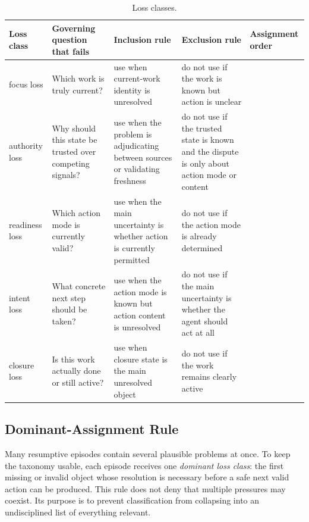 \documentclass[preprint,12pt]{elsarticle}
\begin{document}
\begin{table}[H]
\caption{Loss classes.}
\label{tab:loss-classes}
\centering
\footnotesize
\setlength{\tabcolsep}{4pt}
\begin{tabularx}{\textwidth}{>{\raggedright\arraybackslash}p{} >{\raggedright\arraybackslash}p{} >{\raggedright\arraybackslash}p{} >{\raggedright\arraybackslash}p{} >{\raggedright\arraybackslash}p{}}
\toprule
Loss class & Governing question that fails & Inclusion rule & Exclusion rule & Assignment order \\
\midrule
focus loss & Which work is truly current? & use when current-work identity is unresolved & do not use if the work is known but action is unclear & 1 \\
authority loss & Why should this state be trusted over competing signals? & use when the problem is adjudicating between sources or validating freshness & do not use if the trusted state is known and the dispute is only about action mode or content & 2 \\
readiness loss & Which action mode is currently valid? & use when the main uncertainty is whether action is currently permitted & do not use if the action mode is already determined & 3 \\
intent loss & What concrete next step should be taken? & use when the action mode is known but action content is unresolved & do not use if the main uncertainty is whether the agent should act at all & 4 \\
closure loss & Is this work actually done or still active? & use when closure state is the main unresolved object & do not use if the work remains clearly active & 5 \\
\bottomrule
\end{tabularx}
\end{table}

\subsection{Dominant-Assignment Rule}

Many resumptive episodes contain several plausible problems at once. To keep the taxonomy usable, each episode receives one \emph{dominant loss class}: the first missing or invalid object whose resolution is necessary before a safe next valid action can be produced. This rule does not deny that multiple pressures may coexist. Its purpose is to prevent classification from collapsing into an undisciplined list of everything relevant.
\end{document}
